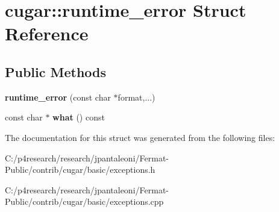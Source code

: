 \hypertarget{structcugar_1_1runtime__error}{}\section{cugar\+:\+:runtime\+\_\+error Struct Reference}
\label{structcugar_1_1runtime__error}
\subsection*{Public Methods}
\begin{DoxyCompactItemize}
\item 
\mbox{\label{structcugar_1_1runtime__error_a09de60de017e50717103100c20848151}} 
{\bfseries runtime\+\_\+error} (const char $\ast$format,...)
\item 
\mbox{\label{structcugar_1_1runtime__error_ad3b00728288a0ce17c9f6fb7edbedc3c}} 
const char $\ast$ {\bfseries what} () const
\end{DoxyCompactItemize}


The documentation for this struct was generated from the following files\+:\begin{DoxyCompactItemize}
\item 
C\+:/p4research/research/jpantaleoni/\+Fermat-\/\+Public/contrib/cugar/basic/exceptions.\+h\item 
C\+:/p4research/research/jpantaleoni/\+Fermat-\/\+Public/contrib/cugar/basic/exceptions.\+cpp\end{DoxyCompactItemize}
